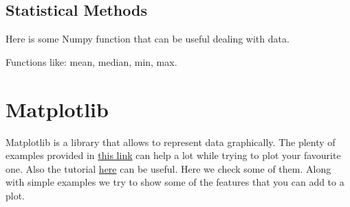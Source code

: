 \documentclass[10pt,a4paper]{article}
\begin{document}
\subsection{Statistical Methods}
Here is some Numpy function that can be useful dealing with data. 

Functions like: mean, median, min, max. 




















\section{Matplotlib}
Matplotlib is a library that allows to represent data graphically. The plenty of examples provided in \href{https://matplotlib.org/gallery/index.html}{this link} can help a lot while trying to plot your favourite one. Also the tutorial \href{https://python-course.eu/matplotlib.php}{here} can be useful.
Here we check some of them. Along with simple examples we try to show some of the features that you can add to a plot.
\end{document}
